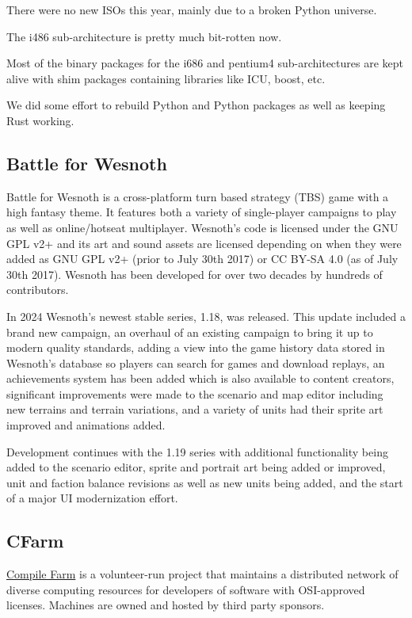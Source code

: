 \documentclass[a4paper]{report}
\begin{document}
There were no new ISOs this year, mainly due to a broken Python universe.

The i486 sub-architecture is pretty much bit-rotten now.

Most of the binary packages for the i686 and  pentium4 sub-architectures are kept alive with shim packages containing libraries like ICU, boost, etc.

We did some effort to rebuild Python and Python packages as well as keeping Rust working.

\subsection{Battle for Wesnoth}

Battle for Wesnoth is a cross-platform turn based strategy (TBS) game with a high fantasy theme. It features both a variety of single-player campaigns to play as well as online/hotseat multiplayer. Wesnoth's code is licensed under the GNU GPL v2+ and its art and sound assets are licensed depending on when they were added as GNU GPL v2+ (prior to July 30th 2017) or CC BY-SA 4.0 (as of July 30th 2017). Wesnoth has been developed for over two decades by hundreds of contributors.

In 2024 Wesnoth's newest stable series, 1.18, was released. This update included a brand new campaign, an overhaul of an existing campaign to bring it up to modern quality standards, adding a view into the game history data stored in Wesnoth's database so players can search for games and download replays, an achievements system has been added which is also available to content creators, significant improvements were made to the scenario and map editor including new terrains and terrain variations, and a variety of units had their sprite art improved and animations added.

Development continues with the 1.19 series with additional functionality being added to the scenario editor, sprite and portrait art being added or improved, unit and faction balance revisions as well as new units being added, and the start of a major UI modernization effort.

\subsection{CFarm}

\href{https://portal.cfarm.net/}{Compile Farm} is a volunteer-run project that maintains a distributed network of diverse computing resources for developers of software with OSI-approved licenses. Machines are owned and hosted by third party sponsors.
\end{document}
